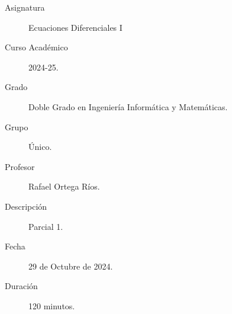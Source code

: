 \documentclass[12pt]{article}
\begin{document}

    
    

    \begin{description}
        \item[Asignatura] Ecuaciones Diferenciales I
        \item[Curso Académico] 2024-25.
        \item[Grado] Doble Grado en Ingeniería Informática y Matemáticas.
        \item[Grupo] Único.
        \item[Profesor] Rafael Ortega Ríos.
        \item[Descripción] Parcial 1.
        \item[Fecha] 29 de Octubre de 2024.
        \item[Duración] 120 minutos.
    
    \end{description}
    \newpage
\end{document}
